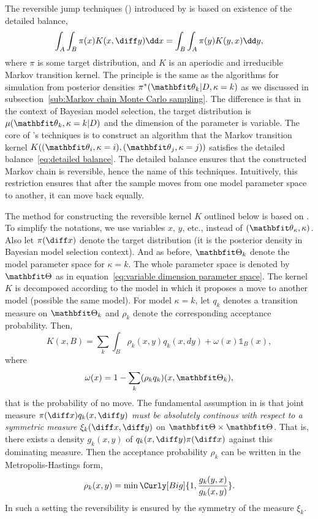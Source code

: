 The reversible jump \mcmc techniques (\rjmcmc) introduced by
\textcite{Green1995} is based on existence of the detailed balance,
\begin{equation}
  \int_A\int_B\pi(x)K(x,\diff y)\dd x = \int_B\int_A\pi(y)K(y,x)\dd y,
  \label{eq:detailed balance}
\end{equation}
where $\pi$ is some target distribution, and $K$ is an aperiodic and
irreducible Markov transition kernel. The principle is the same as the \mcmc
algorithms for simulation from posterior densities $\pi^*(\bth_k|D,\kappa =
k)$ as we discussed in subsection~\ref{sub:Markov chain Monte Carlo sampling}.
The difference is that in the context of Bayesian model selection, the target
distribution is $\mu(\bth_k,\kappa = k|D)$ and the dimension of the parameter
is variable. The core of \textcite{Green1995}'s techniques is to construct an
algorithm that the Markov transition kernel $K((\bth_i,\kappa = i),
(\bth_j,\kappa = j))$ satisfies the detailed balance~\eqref{eq:detailed
  balance}. The detailed balance ensures that the constructed Markov chain is
reversible, hence the name of this techniques. Intuitively, this restriction
ensures that after the sample moves from one model parameter space to another,
it can move back equally.

The method for constructing the reversible kernel $K$ outlined below is based
on \textcite[][chap.~11]{Robert2004}. To simplify the notations, we use
variables $x$, $y$, etc., instead of $(\bth_{\kappa}, \kappa)$. Also let
$\pi(\diff x)$ denote the target distribution (it is the posterior density in
Bayesian model selection context). And as before, $\bTh_k$ denote the model
parameter space for $\kappa = k$. The whole parameter space is denoted by
$\bTh$ as in equation~\eqref{eq:variable dimension parameter space}. The
kernel $K$ is decomposed according to the model in which it proposes a move to
another model (possible the same model).  For model $\kappa=k$, let $q_k$
denotes a transition measure on $\bTh_k$ and $\rho_k$ denote the corresponding
acceptance probability. Then,
\begin{equation}
  K(x,B) = \sum_k\int_B\rho_k(x,y)q_k(x,dy)+\omega(x)\mathbb{1}_B(x),
\end{equation}
where
\begin{equation}
  \omega(x) = 1 - \sum_k(\rho_k q_k)(x,\bTh_k),
\end{equation}
that is the probability of no move. The fundamental assumption in
\textcite{Green1995} is that joint measure $\pi(\diff x)q_k(x,\diff y)$
\emph{must be absolutely continous with respect to a symmetric measure}
$\xi_k(\diff x, \diff y)$ on $\bTh\times\bTh$. That is, there exists a density
$g_k(x,y)$ of $q_k(x,\diff y)\pi(\diff x)$ against this dominating measure.
Then the acceptance probability $\rho_k$ can be written in the
Metropolis-Hastings form,
\begin{equation}
  \rho_k(x,y) = \min\Curly[Big]{1,\frac{g_k(y,x)}{g_k(x,y)}}.
\end{equation}
In such a setting the reversibility is ensured by the symmetry of the measure
$\xi_k$.

